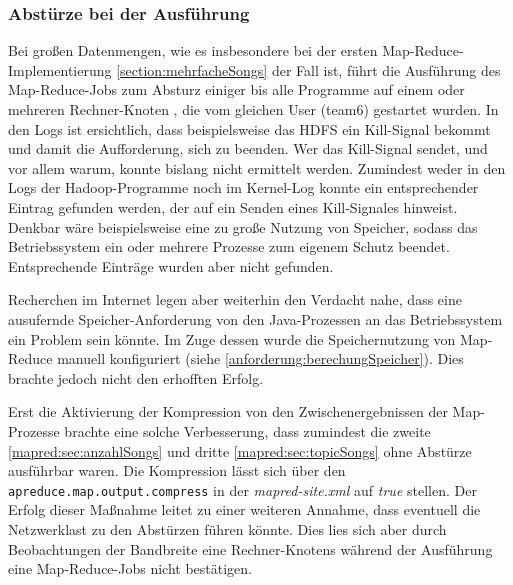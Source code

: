 \subsubsection{Abstürze bei der Ausführung}
Bei großen Datenmengen, wie es insbesondere bei der ersten Map-Reduce-Implementierung \ref{section:mehrfacheSongs} der Fall ist,
führt die Ausführung des Map-Reduce-Jobs zum Absturz einiger bis alle Programme auf einem oder mehreren Rechner-Knoten
, die vom gleichen User (team6) gestartet wurden.
In den Logs ist ersichtlich, dass beispielsweise das HDFS ein Kill-Signal bekommt und damit die Aufforderung, sich zu beenden.
Wer das Kill-Signal sendet, und vor allem warum, konnte bislang nicht ermittelt werden. Zumindest weder in den Logs der 
Hadoop-Programme noch im Kernel-Log konnte ein entsprechender Eintrag gefunden werden, der auf ein Senden eines
Kill-Signales hinweist. Denkbar wäre beispielsweise eine zu große Nutzung von Speicher, sodass das Betriebssystem ein
oder mehrere Prozesse zum eigenem Schutz beendet. Entsprechende Einträge wurden aber nicht gefunden.

Recherchen im Internet legen aber weiterhin den Verdacht nahe, dass eine ausufernde Speicher-Anforderung von den Java-Prozessen
an das Betriebssystem ein Problem sein könnte. Im Zuge dessen wurde die Speichernutzung von Map-Reduce manuell konfiguriert 
(siehe \ref{anforderung:berechungSpeicher}). Dies brachte jedoch nicht den erhofften Erfolg.

Erst die Aktivierung der Kompression von den Zwischenergebnissen der Map-Prozesse brachte eine solche Verbesserung, dass zumindest
die zweite \ref{mapred:sec:anzahlSongs} und dritte \ref{mapred:sec:topicSongs} ohne Abstürze ausführbar waren. Die Kompression
lässt sich über den \texttt{apreduce.map.output.compress} in der \textit{mapred-site.xml} auf \textit{true} stellen.
Der Erfolg dieser Maßnahme leitet zu einer weiteren Annahme, dass eventuell die Netzwerklast zu den Abstürzen führen
könnte. Dies lies sich aber durch Beobachtungen der Bandbreite eine Rechner-Knotens während der Ausführung
eine Map-Reduce-Jobs nicht bestätigen.
